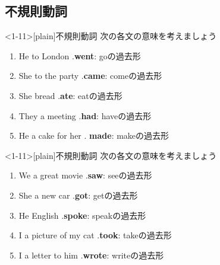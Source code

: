 \documentclass[aspectratio=169,xcolor={dvipsnames,table}]{beamer}
\newcommand{\myaudio}[1]{\href{#1}{\faVolumeUp}}
\begin{document}
%
\subsection{不規則動詞}
\begin{frame}<1-11>[plain]{不規則動詞}
 次の各文の意味を考えましょう

 \begin{enumerate}
  \item He  to London .\hfill{}{\small \textbf{went}: goの過去形}
  \item She  to the party .\hfill{}{\small \textbf{came}: comeの過去形}
  \item She  bread .\hfill{}{\small \textbf{ate}: eatの過去形}
  \item They  a meeting .\hfill{}{\small \textbf{had}: haveの過去形}
  \item He  a cake for her . \hfill{}{\small \textbf{made}: makeの過去形}
\end{enumerate}
\hfill\myaudio{./audio/025_past_do_11.mp3}

\end{frame}


\begin{frame}<1-11>[plain]{不規則動詞}
 次の各文の意味を考えましょう

 \begin{enumerate}%
   \item We   a great movie  .\hfill{}{\small \textbf{saw}: seeの過去形}
  \item She  a new car  .\hfill{}{\small \textbf{got}: getの過去形}
  \item He  English  .\hfill{}{\small \textbf{spoke}: speakの過去形}
  \item I  a picture of my cat  .\hfill{}{\small \textbf{took}: takeの過去形}
  \item I  a letter to him  .\hfill{}{\small \textbf{wrote}: writeの過去形}
\end{enumerate}
\hfill\myaudio{./audio/025_past_do_12.mp3}

\end{frame}
\end{document}
